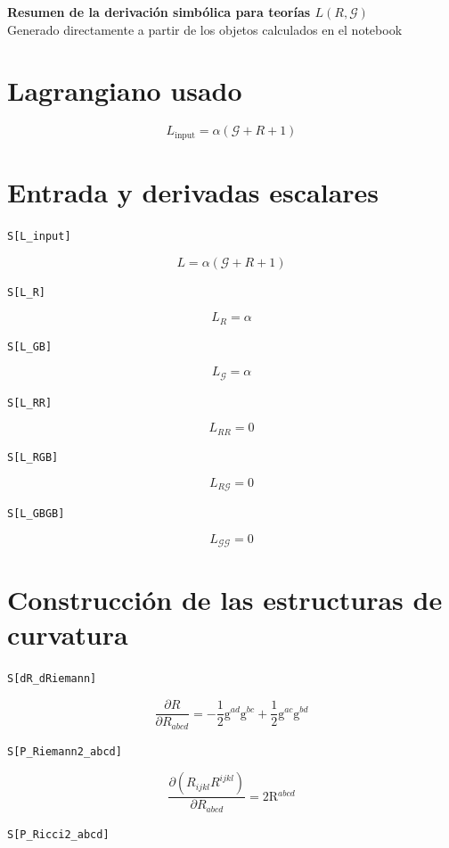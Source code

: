 \documentclass[11pt,a4paper]{article}
\begin{document}
\begin{center}
{\Large\bfseries Resumen de la derivación simbólica para teorías $L(R,\mathcal G)$}\\[0.5em]
{\small Generado directamente a partir de los objetos calculados en el notebook}
\end{center}

\section*{Lagrangiano usado}
\[
\boxed{L_{\mathrm{input}} = \alpha \left(\mathcal{G} + R + 1\right)}
\]


\section*{Entrada y derivadas escalares}

\noindent\texttt{S[L\_input]}

\[
\boxed{L = \alpha \left(\mathcal{G} + R + 1\right)}
\]


\noindent\texttt{S[L\_R]}

\[
\boxed{L_R = \alpha}
\]


\noindent\texttt{S[L\_GB]}

\[
\boxed{L_{\mathcal G} = \alpha}
\]


\noindent\texttt{S[L\_RR]}

\[
\boxed{L_{RR} = 0}
\]


\noindent\texttt{S[L\_RGB]}

\[
\boxed{L_{R\mathcal G} = 0}
\]


\noindent\texttt{S[L\_GBGB]}

\[
\boxed{L_{\mathcal G\mathcal G} = 0}
\]


\section*{Construcción de las estructuras de curvatura}

\noindent\texttt{S[dR\_dRiemann]}

\[
\boxed{\dfrac{\partial R}{\partial R_{abcd}} = -\frac{1}{2}\mathrm{g}{}^{ad}\mathrm{g}{}^{bc} + \frac{1}{2}\mathrm{g}{}^{ac}\mathrm{g}{}^{bd}}
\]


\noindent\texttt{S[P\_Riemann2\_abcd]}

\[
\boxed{\dfrac{\partial (R_{ijkl}R^{ijkl})}{\partial R_{abcd}} = 2\mathrm{R}{}^{abcd}}
\]


\noindent\texttt{S[P\_Ricci2\_abcd]}
\end{document}
